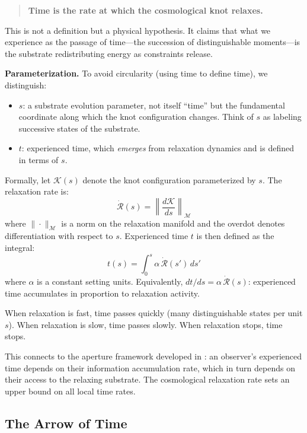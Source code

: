 \documentclass[11pt,a4paper]{article}
\begin{document}
\begin{quote}
\textbf{Time is the rate at which the cosmological knot relaxes.}
\end{quote}

This is not a definition but a physical hypothesis. It claims that what we experience as the passage of time---the succession of distinguishable moments---is the substrate redistributing energy as constraints release.

\textbf{Parameterization.} To avoid circularity (using time to define time), we distinguish:
\begin{itemize}
    \item $s$: a substrate evolution parameter, not itself ``time'' but the fundamental coordinate along which the knot configuration changes. Think of $s$ as labeling successive states of the substrate.
    \item $t$: experienced time, which \emph{emerges} from relaxation dynamics and is defined in terms of $s$.
\end{itemize}

Formally, let $\mathcal{K}(s)$ denote the knot configuration parameterized by $s$. The relaxation rate is:
\begin{equation}
    \dot{\mathcal{R}}(s) = \left\| \frac{d\mathcal{K}}{ds} \right\|_{\mathcal{M}}
\end{equation}
where $\|\cdot\|_{\mathcal{M}}$ is a norm on the relaxation manifold and the overdot denotes differentiation with respect to $s$. Experienced time $t$ is then defined as the integral:
\begin{equation}
    t(s) = \int_0^s \alpha \, \dot{\mathcal{R}}(s') \, ds'
\end{equation}
where $\alpha$ is a constant setting units. Equivalently, $dt/ds = \alpha \, \dot{\mathcal{R}}(s)$: experienced time accumulates in proportion to relaxation activity.

When relaxation is fast, time passes quickly (many distinguishable states per unit $s$). When relaxation is slow, time passes slowly. When relaxation stops, time stops.

This connects to the aperture framework developed in \cite{todd2025aperture}: an observer's experienced time depends on their information accumulation rate, which in turn depends on their access to the relaxing substrate. The cosmological relaxation rate sets an upper bound on all local time rates.

\subsection{The Arrow of Time}
\end{document}
